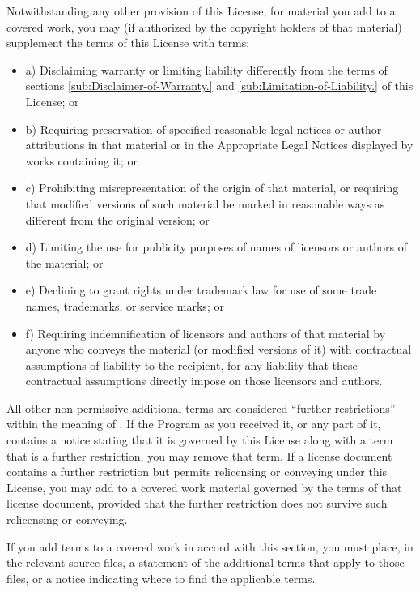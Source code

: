 \documentclass[10pt,english]{article}
\begin{document}
Notwithstanding any other provision of this License, for material
you add to a covered work, you may (if authorized by the copyright
holders of that material) supplement the terms of this License with
terms:
\begin{itemize}
\item a) Disclaiming warranty or limiting liability differently from the
terms of sections \ref{sub:Disclaimer-of-Warranty.} and \ref{sub:Limitation-of-Liability.}
of this License; or
\item b) Requiring preservation of specified reasonable legal notices or
author attributions in that material or in the Appropriate Legal Notices
displayed by works containing it; or
\item c) Prohibiting misrepresentation of the origin of that material, or
requiring that modified versions of such material be marked in reasonable
ways as different from the original version; or
\item d) Limiting the use for publicity purposes of names of licensors or
authors of the material; or
\item e) Declining to grant rights under trademark law for use of some trade
names, trademarks, or service marks; or
\item f) Requiring indemnification of licensors and authors of that material
by anyone who conveys the material (or modified versions of it) with
contractual assumptions of liability to the recipient, for any liability
that these contractual assumptions directly impose on those licensors
and authors.
\end{itemize}
All other non-permissive additional terms are considered \textquotedblleft{}further
restrictions\textquotedblright{} within the meaning of .
If the Program as you received it, or any part of it, contains a notice
stating that it is governed by this License along with a term that
is a further restriction, you may remove that term. If a license document
contains a further restriction but permits relicensing or conveying
under this License, you may add to a covered work material governed
by the terms of that license document, provided that the further restriction
does not survive such relicensing or conveying.

If you add terms to a covered work in accord with this section, you
must place, in the relevant source files, a statement of the additional
terms that apply to those files, or a notice indicating where to find
the applicable terms.
\end{document}
